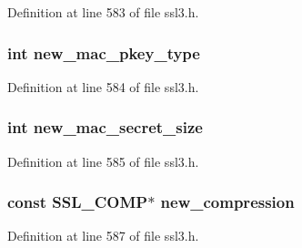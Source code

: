 Definition at line 583 of file ssl3.\+h.

\subsubsection[{\texorpdfstring{new\+\_\+mac\+\_\+pkey\+\_\+type}{new_mac_pkey_type}}]{\setlength{\rightskip}{0pt plus 5cm}int new\+\_\+mac\+\_\+pkey\+\_\+type}\hypertarget{structssl3__state__st_ab5bb160de14310f14b89685bf7a4659a}{}\label{structssl3__state__st_ab5bb160de14310f14b89685bf7a4659a}


Definition at line 584 of file ssl3.\+h.

\subsubsection[{\texorpdfstring{new\+\_\+mac\+\_\+secret\+\_\+size}{new_mac_secret_size}}]{\setlength{\rightskip}{0pt plus 5cm}int new\+\_\+mac\+\_\+secret\+\_\+size}\hypertarget{structssl3__state__st_ad82dcd0686b8aba6c6293cc086e99d06}{}\label{structssl3__state__st_ad82dcd0686b8aba6c6293cc086e99d06}


Definition at line 585 of file ssl3.\+h.

\subsubsection[{\texorpdfstring{new\+\_\+compression}{new_compression}}]{\setlength{\rightskip}{0pt plus 5cm}const {\bf S\+S\+L\+\_\+\+C\+O\+MP}$\ast$ new\+\_\+compression}\hypertarget{structssl3__state__st_ad4e3a32e2b1e55dcd310c7bc0e07ec57}{}\label{structssl3__state__st_ad4e3a32e2b1e55dcd310c7bc0e07ec57}


Definition at line 587 of file ssl3.\+h.

